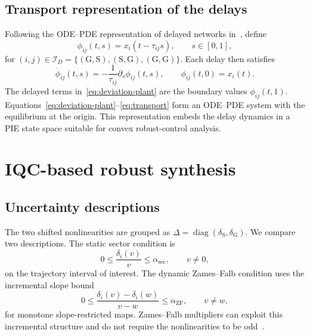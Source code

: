 \documentclass[9pt,twocolumn,twoside]{pnas-new}
\newcommand{\Srate}{\mathrm{S}}
\newcommand{\Grate}{\mathrm{G}}
\begin{document}
\subsection{Transport representation of the delays}

Following the ODE--PDE representation of delayed networks in~\cite{peet2020representationnetworkssystemsdelay}, define
\begin{equation*}
\phi_{ij}(t,s)=x_i(t-\tau_{ij}s),\qquad s\in[0,1],
\end{equation*}
for $(i,j)\in\mathcal I_D=\{(\Grate,\Srate),(\Srate,\Grate),(\Grate,\Grate)\}$. Each delay then satisfies
\begin{equation}
\dot\phi_{ij}(t,s)=-\frac{1}{\tau_{ij}}\partial_s\phi_{ij}(t,s),\qquad
\phi_{ij}(t,0)=x_i(t).
\label{eq:transport}
\end{equation}
The delayed terms in~\eqref{eq:deviation-plant} are the boundary values $\phi_{ij}(t,1)$. Equations~\eqref{eq:deviation-plant}--\eqref{eq:transport} form an ODE--PDE system with the equilibrium at the origin. This representation embeds the delay dynamics in a PIE state space suitable for convex robust-control analysis.

\section{IQC-based robust synthesis}

\subsection{Uncertainty descriptions}

The two shifted nonlinearities are grouped as $\Delta=\operatorname{diag}(\delta_{\Srate},\delta_{\Grate})$. We compare two descriptions. The static sector condition is
\begin{equation}
0\leq \frac{\delta_i(v)}{v}\leq\alpha_{\mathrm{sec}},\qquad v\neq0,
\label{eq:sector}
\end{equation}
on the trajectory interval of interest. The dynamic Zames--Falb condition uses the incremental slope bound
\begin{equation}
0\leq\frac{\delta_i(v)-\delta_i(w)}{v-w}\leq\alpha_{\mathrm{ZF}},\qquad v\neq w,
\label{eq:slope}
\end{equation}
for monotone slope-restricted maps. Zames--Falb multipliers can exploit this incremental structure and do not require the nonlinearities to be odd~\cite{turner2022zamesfalbmultipliersdontpanic}.
\end{document}
